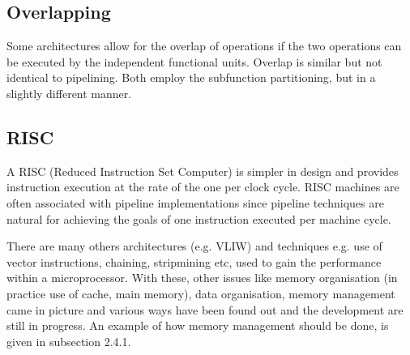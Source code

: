 \subsection{Overlapping} Some architectures allow for the overlap of operations if the two operations can be executed by the independent functional units.
Overlap is similar but not identical to pipelining. Both employ the subfunction partitioning, but in a slightly different manner. 

\subsection{RISC}
A RISC (Reduced Instruction Set Computer) is simpler in design and provides instruction execution at the rate of the one per clock cycle. RISC machines are
often associated with pipeline implementations since pipeline techniques are natural for achieving the goals of one instruction executed per machine
cycle.\par
\hspace{2in} There are many others architectures (e.g. VLIW) and techniques e.g. use of vector instructions, chaining, stripmining etc, used to gain the
performance within a microprocessor. With these, other issues like memory organisation (in practice use of cache, main memory), data organisation,
memory management came in picture and various ways have been found out and the development are still in progress. An example of how memory management
should be done, is given in subsection 2.4.1.

